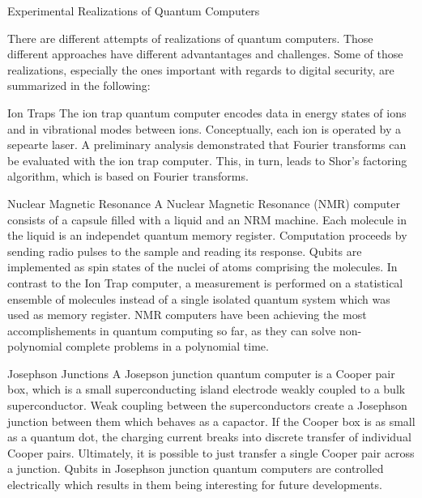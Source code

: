 \documentclass[aps,twocolumn,preprintnumbers]{revtex4}
\begin{document}
\begin{section}{Experimental Realizations of Quantum Computers}

There are different attempts of realizations of quantum computers.
Those different approaches have different advantantages and challenges. 
Some of those realizations, especially the ones important with regards to digital security, 
are summarized in the following: 

\begin{subsection}{Ion Traps}
The ion trap quantum computer encodes data in energy states of ions and in vibrational modes between ions. 
Conceptually, each ion is operated by a sepearte laser. 
A preliminary analysis demonstrated that Fourier transforms can be evaluated with the ion trap computer. 
This, in turn, leads to Shor's factoring algorithm, 
which is based on Fourier transforms.
\end{subsection}

\begin{subsection}{Nuclear Magnetic Resonance}
A Nuclear Magnetic Resonance (NMR) computer consists of a capsule filled with a liquid and an NRM machine. 
Each molecule in the liquid is an independet quantum memory register. 
Computation proceeds by sending radio pulses to the sample and reading its response. 
Qubits are implemented as spin states of the nuclei of atoms comprising the molecules. 
In contrast to the Ion Trap computer, 
a measurement is performed on a statistical ensemble of molecules instead of a single isolated quantum system which was used as memory register. 
NMR computers have been achieving the most accomplishements in quantum computing so far, 
as they can solve non-polynomial complete problems in a polynomial time.
\end{subsection}

\begin{subsection}{Josephson Junctions}
A Josepson junction quantum computer is a Cooper pair box,
which is a small superconducting island electrode weakly coupled to a bulk superconductor. 
Weak coupling between the superconductors create a Josephson junction between them which behaves as a capactor. 
If the Cooper box is as small as a quantum dot, 
the charging current breaks into discrete transfer of individual Cooper pairs. 
Ultimately, it is possible to just transfer a single Cooper pair across a junction. 
Qubits in Josephson junction quantum computers are controlled electrically which results in them being interesting for future developments.
\end{subsection}

\end{section}
\end{document}
